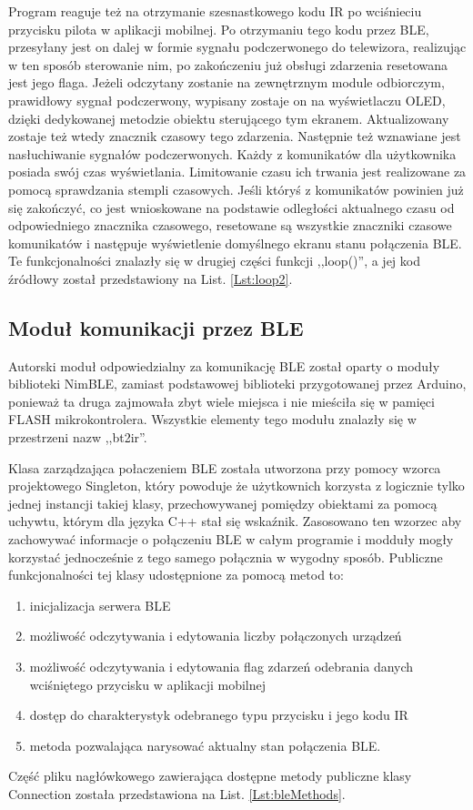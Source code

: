 \documentclass[12pt,twoside,draft]{article}
\begin{document}
Program reaguje też na otrzymanie szesnastkowego kodu IR po wciśnieciu przycisku  pilota w aplikacji mobilnej. Po otrzymaniu tego kodu przez BLE, przesyłany jest on dalej w formie sygnału podczerwonego do telewizora, realizując w ten sposób sterowanie nim, po zakończeniu już obsługi zdarzenia resetowana jest jego flaga. Jeżeli odczytany zostanie na zewnętrznym module odbiorczym, prawidłowy sygnał podczerwony, wypisany zostaje on na wyświetlaczu OLED, dzięki dedykowanej metodzie obiektu sterującego tym ekranem. Aktualizowany zostaje też wtedy znacznik czasowy tego zdarzenia. Następnie też wznawiane jest nasłuchiwanie sygnałów podczerwonych. Każdy z komunikatów dla użytkownika posiada swój czas wyświetlania. Limitowanie czasu ich trwania jest realizowane za pomocą sprawdzania stempli czasowych. Jeśli któryś z komunikatów powinien już się zakończyć, co jest wnioskowane na podstawie odległości aktualnego czasu od odpowiedniego znacznika czasowego, resetowane są wszystkie znaczniki czasowe komunikatów i następuje wyświetlenie domyślnego ekranu stanu połączenia BLE. Te funkcjonalności znalazły się w drugiej części funkcji ,,loop()'', a jej kod źródłowy został przedstawiony na List. \ref{Lst:loop2}.

\subsection{Moduł komunikacji przez BLE}
Autorski moduł odpowiedzialny za komunikację BLE został oparty o moduły biblioteki NimBLE\cite{nimBLE}, zamiast podstawowej biblioteki przygotowanej przez Arduino, ponieważ ta druga zajmowała zbyt wiele miejsca i nie mieściła się w pamięci FLASH mikrokontrolera. Wszystkie elementy tego modułu znalazły się w przestrzeni nazw ,,bt2ir''.

Klasa zarządzająca połaczeniem BLE została utworzona przy pomocy wzorca projektowego Singleton\cite{designPatterns}, który powoduje że użytkownich korzysta z logicznie tylko jednej instancji takiej klasy, przechowywanej pomiędzy obiektami za pomocą uchywtu, którym dla języka C++ stał się wskaźnik. Zasosowano ten wzorzec aby zachowywać informacje o połączeniu BLE w całym programie i modduły mogły korzystać jednocześnie z tego samego połącznia w wygodny sposób. Publiczne funkcjonalności tej klasy udostępnione za pomocą metod to:
\begin{enumerate}[label=\alph*), leftmargin=1.25cm]
   \item inicjalizacja serwera BLE
   \item możliwość odczytywania i edytowania liczby połączonych urządzeń
   \item możliwość odczytywania i edytowania flag zdarzeń odebrania danych wciśniętego przycisku w aplikacji mobilnej
   \item dostęp do charakterystyk odebranego typu przycisku i jego kodu IR
   \item metoda pozwalająca narysować aktualny stan połączenia BLE.
\end{enumerate} Część pliku nagłówkowego zawierająca dostępne metody publiczne klasy Connection została przedstawiona na List. \ref*{Lst:bleMethods}.
\end{document}
